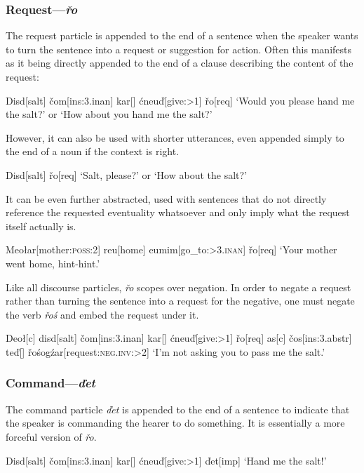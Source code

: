 \documentclass[10pt]{article}
\newcommand{\sk}{\textsc}
\newcommand{\vd}{ď}
\newcommand{\vc}{č}
\newcommand{\vr}{ř}
\begin{document}
\subsubsection{Request---\textit{\vr o}}\label{sec:ro}

The request particle is appended to the end of a sentence when the speaker wants to turn the sentence into a request or suggestion for action. Often this manifests as it being directly appended to the end of a clause describing the content of the request:

\ex
\begingl
Disd[salt]
\vc om[\sc ins:3.inan]
kar[]
\'cneu\vd[give:\sk{>1}]
\vr o[\sc req]
\glft `Would you please hand me the salt?' or `How about you hand me the salt?'
\endgl
\xe

However, it can also be used with shorter utterances, even appended simply to the end of a noun if the context is right.

\ex
\begingl
Disd[salt]
\vr o[\sc req]
\glft `Salt, please?' or `How about the salt?'
\endgl
\xe

It can be even further abstracted, used with sentences that do not directly reference the requested eventuality whatsoever and only imply what the request itself actually is.

\ex
\begingl
Meo\l ar[mother:\sk{poss:2}]
reu[home]
eumim[go\_to:\sk{>3.inan}]
\vr o[\sc req]
\glft `Your mother went home, hint-hint.'
\endgl
\xe

Like all discourse particles, \textit{\vr o} scopes over negation. In order to negate a request rather than turning the sentence into a request for the negative, one must negate the verb \textit{\vr o\'s} and embed the request under it.

\ex
\begingl
Deo\l[\sc c]
disd[salt]
\vc om[\sc ins:3.inan]
kar[]
\'cneu\vd[give:\sk{>1}]
\vr o[\sc req]
\nogloss{,}
as[\sc c]
\vc os[\sc ins:3.abstr]
te\vd[]
\vr o\'sog\'zar[request:\sk{neg.inv:>2}]
\glft `I'm not asking you to pass me the salt.'
\endgl
\xe

\subsubsection{Command---\textit{\vd et}}

The command particle \textit{\vd et} is appended to the end of a sentence to indicate that the speaker is commanding the hearer to do something. It is essentially a more forceful version of \textit{\vr o}. 

\ex
\begingl
Disd[salt]
\vc om[\sc ins:3.inan]
kar[]
\'cneu\vd[give:\sk{>1}]
\vd et[\sc imp]
\glft `Hand me the salt!'
\endgl
\xe
\end{document}
